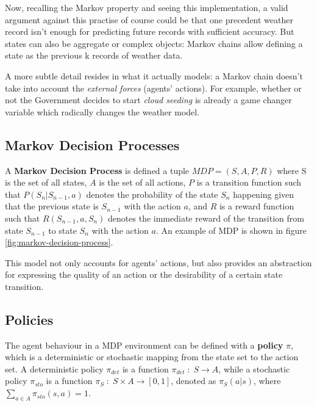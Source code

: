 Now, recalling the Markov property and seeing this implementation, a valid argument against this practise of course could be that one precedent weather record isn't enough for predicting future records with sufficient accuracy. But states can also be aggregate or complex objects: Markov chains allow defining a state as the previous k records of weather data.

A more subtle detail resides in what it actually models: a Markov chain doesn't take into account the \textit{external forces} (agents' actions). For example, whether or not the Government decides to start \textit{cloud seeding} is already a game changer variable which radically changes the weather model.


\subsection{Markov Decision Processes}

A \textbf{Markov Decision Process} is defined a tuple $MDP = (S, A, P, R)$ where S is the set of all states, $A$ is the set of all actions, $P$ is a transition function such that $P(S_n | S_{n-1}, a)$ denotes the probability of the state $S_n$ happening given that the previous state is $S_{n-1}$ with the action $a$, and $R$ is a reward function such that $R(S_{n-1}, a, S_{n})$ denotes the immediate reward of the transition from state $S_{n-1}$ to state $S_n$ with the action $a$. An example of MDP is shown in figure \ref{fig:markov-decision-process}.

This model not only accounts for agents' actions, but also provides an abstraction for expressing the quality of an action or the desirability of a certain state transition.


\subsection{Policies}

The agent behaviour in a MDP environment can be defined with a \textbf{policy} $\pi$, which is a deterministic or stochastic mapping from the state set to the action set.
A deterministic policy $\pi_{det}$ is a function $\pi_{det} \; : \; S \rightarrow A$, while a stochastic policy $\pi_{sto}$ is a function $\pi _ {S} \; : \; S \times A \rightarrow [0, 1]$, denoted as $\pi _ {S}(a | s)$, where $\sum_{a \in A} \pi _ {sto} (s, a) = 1$.

